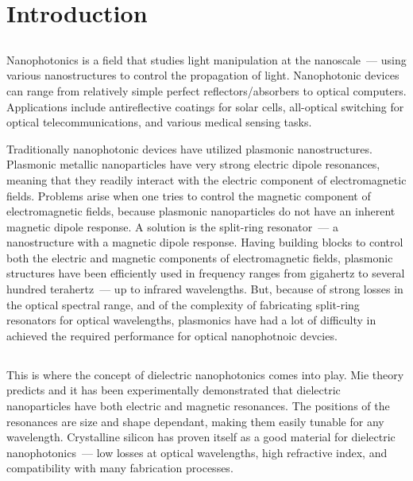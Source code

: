 \section{Introduction}
\label{ch:Intro}
    \subsection{}
        \label{sec:Nanophotonics}
            Nanophotonics is a field that studies light manipulation at the nanoscale~--- using various nanostructures to control the
        propagation of light. Nanophotonic devices can range from relatively simple perfect reflectors/absorbers to optical computers.
        Applications include antireflective coatings for solar cells, all-optical switching for optical telecommunications, and various
        medical sensing tasks.

            Traditionally nanophotonic devices have utilized plasmonic nanostructures. Plasmonic metallic nanoparticles have very strong
        electric dipole resonances, meaning that they readily interact with the electric component of electromagnetic fields. Problems arise
        when one tries to control the magnetic component of electromagnetic fields, because plasmonic nanoparticles do not have an inherent
        magnetic dipole response. A solution is the split-ring resonator~--- a nanostructure with a magnetic dipole response. Having building
        blocks to control both the electric and magnetic components of electromagnetic fields, plasmonic structures have been efficiently
        used in frequency ranges from gigahertz to several hundred terahertz~--- up to infrared wavelengths. But, because of strong losses
        in the optical spectral range, and of the complexity of fabricating split-ring resonators for optical wavelengths, plasmonics have
        had a lot of difficulty in achieved the required performance for optical nanophotnoic devcies.\cite{krasnok2015towards}

    \subsection{}
            This is where the concept of dielectric nanophotonics comes into play. Mie theory predicts\cite{mie1908beitrage} and
        it has been experimentally demonstrated\cite{kuznetsov2012magnetic} that dielectric nanoparticles have both electric and
        magnetic resonances. The positions of the resonances are size and shape dependant, making them easily tunable for any wavelength.
        Crystalline silicon has proven itself as a good material for dielectric nanophotonics~--- low losses at optical wavelengths\cite{palik1998handbook},
        high refractive index, and compatibility with many fabrication processes\cite{popa2008compact,zhao2009mie,evlyukhin2010optical,garcia2011strong,
        krasnok2012all,ginn2012realizing,fu2012directional,krasnok2015towards}.

